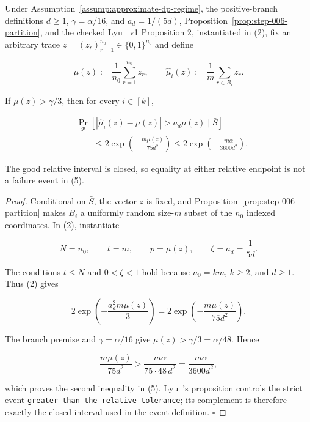 \begin{lemma}\label{lem:step-006-high-tail}
Under Assumption~\ref{assump:approximate-dp-regime}, the positive-branch
definitions \(d\geq1\), \(\gamma=\alpha/16\), and \(a_d=1/(5d)\),
Proposition~\ref{prop:step-006-partition}, and the checked Lyu~\citep{lyu2025} v1
  Proposition 2, instantiated in (2), fix an arbitrary trace
\(z=(z_r)_{r=1}^{n_0}\in\{0,1\}^{n_0}\) and define

\[
 \mu(z):=\frac1{n_0}\sum_{r=1}^{n_0}z_r,
 \qquad
 \widehat\mu_i(z):=\frac1m\sum_{r\in B_i}z_r.
\tag{4}
\]

If \(\mu(z)>\gamma/3\), then for every \(i\in[k]\),

\[
\begin{aligned}
 &\Pr_{\mathcal P}
 \left[|\widehat\mu_i(z)-\mu(z)|>a_d\mu(z)\mid\bar S\right]\\
 &\qquad\leq
 2\exp\!\left(-\frac{m\mu(z)}{75d^2}\right)
 \leq
 2\exp\!\left(-\frac{m\alpha}{3600d^2}\right).
\end{aligned}
\tag{5}
\]

The good relative interval is closed, so equality at either relative
endpoint is not a failure event in (5).


\end{lemma}

\begin{proof}
Conditional on \(\bar S\), the vector \(z\) is fixed, and
Proposition~\ref{prop:step-006-partition} makes \(B_i\) a uniformly random
size-\(m\) subset of the \(n_0\) indexed coordinates.  In (2), instantiate

\[
 N=n_0,\qquad t=m,\qquad p=\mu(z),\qquad \zeta=a_d=\frac1{5d}.
\]

The conditions \(t\leq N\) and \(0<\zeta<1\) hold because
\(n_0=km\), \(k\geq2\), and \(d\geq1\).  Thus (2) gives

\[
 2\exp\!\left(-\frac{a_d^2m\mu(z)}3\right)
 =2\exp\!\left(-\frac{m\mu(z)}{75d^2}\right).
\]

The branch premise and \(\gamma=\alpha/16\) give
\(\mu(z)>\gamma/3=\alpha/48\).  Hence

\[
 \frac{m\mu(z)}{75d^2}
 >\frac{m\alpha}{75\cdot48\,d^2}
 =\frac{m\alpha}{3600d^2},
\]

which proves the second inequality in (5).  Lyu~\citep{lyu2025}'s proposition controls the
strict event \texttt{greater than the relative tolerance}; its complement is
therefore exactly the closed interval used in the event definition.
\(\square\)


\end{proof}

